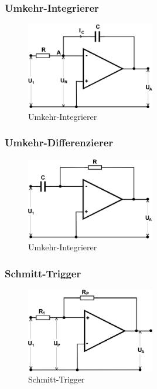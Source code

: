 \subsubsection{Umkehr-Integrierer}

\begin{figure}
	\centering
	\includegraphics[width=0.5\textwidth]{img/int.png}
	\caption{Umkehr-Integrierer \cite{v51}}
	\label{fig:int}
\end{figure}

\subsubsection{Umkehr-Differenzierer}

\begin{figure}
	\centering
	\includegraphics[width=0.5\textwidth]{img/diff.png}
	\caption{Umkehr-Integrierer \cite{v51}}
	\label{fig:diff}
\end{figure}

\subsubsection{Schmitt-Trigger}

\begin{figure}
	\centering
	\includegraphics[width=0.5\textwidth]{img/schmitt.png}
	\caption{Schmitt-Trigger \cite{v51}}
	\label{fig:schmitt}
\end{figure}


